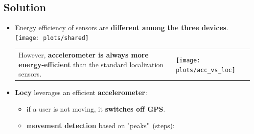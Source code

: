 \documentclass[a2,landscape]{a0poster}
\begin{document}
\mbox{}\framebreak
\begin{center}
\section*{Solution}
\end{center}
\begin{itemize}
   \item Energy efficiency of sensors are \textbf{different among the three devices}.\\
   \texttt{[image: plots/shared]}

 \begin{tabular}[t]{p{8.0cm} p{9.0cm}}
       \vspace{0cm} However, \textbf{accelerometer is always more energy-efficient} than the standard localization sensors. & \vspace{0cm}\texttt{[image: plots/acc\_vs\_loc]}
      \end{tabular}

   \item \textbf{Locy} leverages an efficient \textbf{accelerometer}:
  	   \begin{itemize}		
  	   \item if a user is not moving, it \textbf{switches off GPS}. 
  	   \item \textbf{movement detection} based on "peaks"\ (steps):
  	   

\end{itemize}
\end{itemize}
\end{document}
